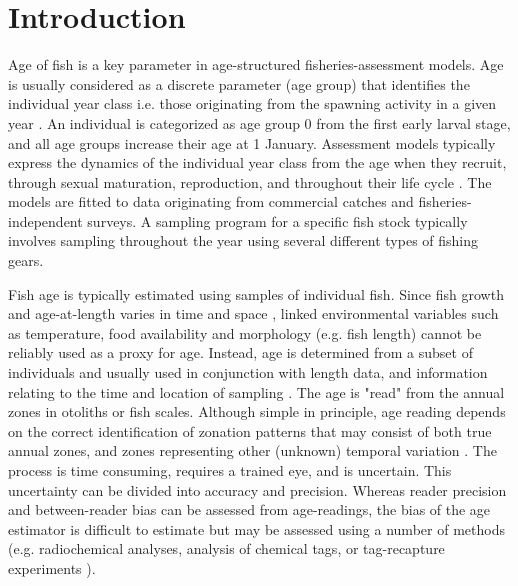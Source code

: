 \documentclass[10pt,letterpaper]{article}
\begin{document}
\section*{Introduction}

Age of fish is a key parameter in age-structured fisheries-assessment models. Age is usually considered as a discrete parameter (age group) that identifies the individual year class i.e. those originating from the spawning activity in a given year \citep{panfili2002manual}. An individual is categorized as age group 0 from the first early larval stage, and all age groups increase their age at 1 January. Assessment models typically express the dynamics of the individual year class from the age when they recruit, through sexual maturation, reproduction, and throughout their life cycle \citep{hilborn1992quantitative}. The models are fitted to data originating from commercial catches and fisheries-independent surveys. A sampling program for a specific fish stock typically involves sampling throughout the year using several different types of fishing gears. 

Fish age is typically estimated using samples of individual fish. Since fish growth and age-at-length varies in time and space \citep[e.g.][]{anes2015age}, 
linked environmental variables such as temperature, food availability and morphology (e.g. fish length) cannot be reliably used as a proxy for age. Instead,  age is determined from a subset of individuals and usually used in conjunction with length data, and information relating to the time and location of sampling \citep{anes2015age}. The age is "read" from the annual zones in otoliths or fish scales. Although simple in principle, age reading depends on the correct identification of zonation patterns that may consist of both true annual zones, and zones representing other (unknown) temporal variation \citep{panfili2002manual,talman2003age}. The process is time consuming, requires a trained eye, and is uncertain. This uncertainty can be divided into accuracy and precision. 
Whereas reader precision and between-reader bias can be assessed from age-readings, the bias of the age estimator is difficult to estimate but may be assessed using a number of methods (e.g. radiochemical analyses, analysis of chemical tags, or tag-recapture experiments \citep{campana2001accuracy}).

\end{document}

